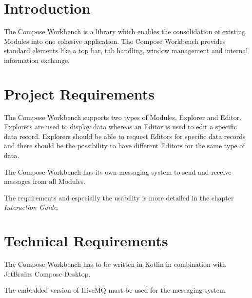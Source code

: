 \section{Introduction}
The Compose Workbench is a library which enables the consolidation of existing Modules into one cohesive application. The Compose Workbench provides standard elements like a top bar, tab handling, window management and internal information exchange.

\section{Project Requirements}
The Compose Workbench supports two types of Modules, Explorer and Editor. Explorers are used to display data whereas an Editor is used to edit a specific data record. Explorers should be able to request Editors for specific data records and there should be the possibility to have different Editors for the same type of data.

The Compose Workbench has its own messaging system to send and receive messages from all Modules.

The requirements and especially the usability is more detailed in the chapter \emph{Interaction Guide}.

\section{Technical Requirements}
The Compose Workbench has to be written in Kotlin in combination with JetBrains Compose Desktop.

The embedded version of HiveMQ must be used for the messaging system.